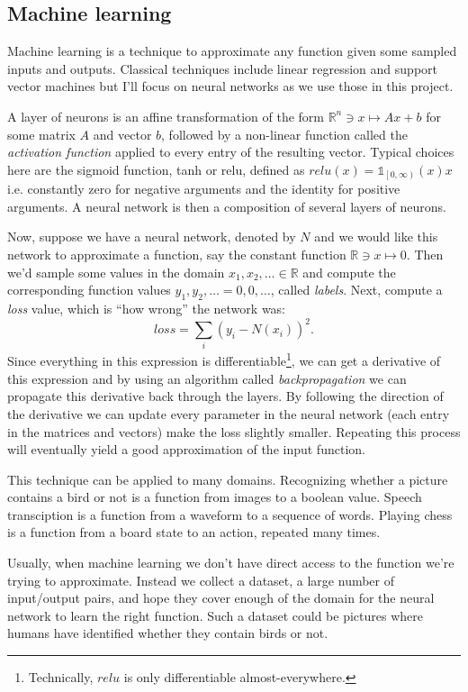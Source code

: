 \documentclass{article}
\theoremstyle{changedot}
\theoremstyle{changedotbreak}
\theoremstyle{nonumberplain}
\newcommand{\m}{\mathbb}
\begin{document}
\subsection{Machine learning}
Machine learning is a technique to approximate any function given some sampled inputs and outputs. Classical techniques include linear regression and support vector machines but I'll focus on neural networks as we use those in this project.

A layer of neurons is an affine transformation of the form $\m R^{n} \ni x \mapsto Ax + b$ for some matrix $A$ and vector $b$, followed by a non-linear function called the \emph{activation function} applied to every entry of the resulting vector. Typical choices here are the sigmoid function, tanh or relu, defined as $relu(x) = \mathds{1}_{\left[0,\infty\right)}(x) x$ i.e. constantly zero for negative arguments and the identity for positive arguments. A neural network is then a composition of several layers of neurons.

Now, suppose we have a neural network, denoted by $N$ and we would like this network to approximate a function, say the constant function $\m R \ni x \mapsto 0$. Then we'd sample some values in the domain $x_{1}, x_{2}, \dots \in \m R$ and compute the corresponding function values $y_{1}, y_{2}, \dots = 0, 0, \dots$, called \emph{labels}. Next, compute a \emph{loss} value, which is ``how wrong'' the network was: \[loss = \sum_{i} (y_{i} - N(x_{i}))^{2}.\] Since everything in this expression is differentiable\footnote{Technically, $relu$ is only differentiable almost-everywhere.}, we can get a derivative of this expression and by using an algorithm called \emph{backpropagation} we can propagate this derivative back through the layers. By following the direction of the derivative we can update every parameter in the neural network (each entry in the matrices and vectors) make the loss slightly smaller. Repeating this process will eventually yield a good approximation of the input function.

This technique can be applied to many domains. Recognizing whether a picture contains a bird or not is a function from images to a boolean value. Speech transciption is a function from a waveform to a sequence of words. Playing chess is a function from a board state to an action, repeated many times.

Usually, when machine learning we don't have direct access to the function we're trying to approximate. Instead we collect a dataset, a large number of input/output pairs, and hope they cover enough of the domain for the neural network to learn the right function. Such a dataset could be pictures where humans have identified whether they contain birds or not.
\end{document}
